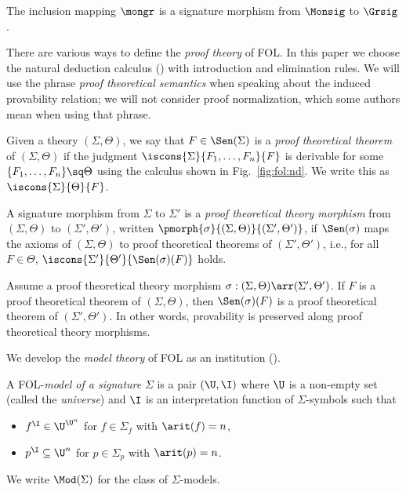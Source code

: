 \documentclass{elsarticle}
\begin{document}
\begin{bnf}
{{\begin{example}
The inclusion mapping $\mongr$ is a signature morphism from $\Monsig$ to $\Grsig$. 
\end{example}

There are various ways to define the \emph{proof theory} of FOL. In this paper we choose the natural deduction calculus (\ND) with introduction and elimination rules. We will use the phrase \emph{proof theoretical semantics} when speaking about the induced provability relation; we will not consider proof normalization, which some authors mean when using that phrase.



\begin{definition}
Given a theory $(\Sigma,\Theta)$, we say that $F\in\Sen(\Sigma)$ is a \emph{proof theoretical theorem} of $(\Sigma,\Theta)$ if the judgment $\iscons{\Sigma}{F_1,\ldots,F_n}{F}$ is derivable for some $\{F_1,\ldots,F_n\}\sq\Theta$ using the calculus shown in Fig.~\ref{fig:fol:nd}. We write this as $\iscons{\Sigma}{\Theta}{F}$.
\end{definition}

\begin{definition}
A signature morphism from $\Sigma$ to $\Sigma'$ is a \emph{proof theoretical theory morphism} from $(\Sigma,\Theta)$ to $(\Sigma',\Theta')$, written  $\pmorph{\sigma}{(\Sigma,\Theta)}{(\Sigma',\Theta')}$, if $\Sen(\sigma)$ maps the axioms of $(\Sigma,\Theta)$ to proof theoretical theorems of $(\Sigma',\Theta')$, i.e., for all $F\in\Theta$,
$\iscons{\Sigma'}{\Theta'}{\Sen({\sigma})(F)}$ holds.
\end{definition}

\begin{lemma}
Assume a proof theoretical theory morphism\linebreak
$\sigma:(\Sigma,\Theta)\arr(\Sigma',\Theta')$. If $F$ is a proof theoretical theorem of $(\Sigma,\Theta)$, then $\Sen(\sigma)(F)$ is a proof theoretical theorem of $(\Sigma',\Theta')$. In other words, provability is preserved along proof theoretical theory morphisms.
\end{lemma}

We develop the \emph{model theory} of FOL as an institution (\cite{institutions}).

\begin{definition}\label{def:model}
A FOL-\emph{model of a signature} $\Sigma$ is a pair $(\U,\I)$ where $\U$ is a non-empty set (called the \emph{universe}) and $\I$ is an interpretation function of $\Sigma$-symbols such that
\begin{itemize}
\item $f^\I\in\U^{\U^n}$ for $f\in \Sigma_f$ with $\arit(f)=n$,
\item $p^\I\subseteq \U^n$ for $p\in \Sigma_p$ with $\arit(p) = n$.
\end{itemize}
We write $\Mod(\Sigma)$ for the class of $\Sigma$-models.
\end{definition}

}}
\end{bnf}
\end{document}
